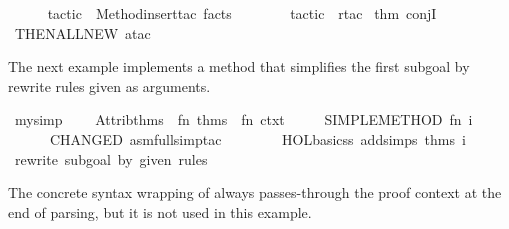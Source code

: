 \begin{isabellebody}
\endisatagML
{\isafoldML}%
%
\isadelimML
\isanewline
%
\endisadelimML
%
\isadelimproof
\ \ \ \ %
\endisadelimproof
%
\isatagproof
{}\isamarkupfalse%
\ {}tactic\ {}\ Method{}insert{}tac\ facts\ {}\ {}{}\isanewline
\ \ \ \ \isamarkupfalse%
\ {}tactic\ {}\ {}rtac\ %
\isaantiq
thm\ conjI{}%
\endisaantiq
\ THEN{}ALL{}NEW\ atac{}\ {}\ {}{}\isanewline
\ \ \ \ \isamarkupfalse%
%
\endisatagproof
{\isafoldproof}%
%
\isadelimproof
\isanewline
%
\endisadelimproof
{}\isamarkupfalse%
%
\begin{isamarkuptext}%
\medskip The next example implements a method that simplifies
  the first subgoal by rewrite rules given as arguments.%
\end{isamarkuptext}%
\isamarkuptrue%
%
\isadelimML
%
\endisadelimML
%
\isatagML
{}\isamarkupfalse%
\ my{}simp\ {}\ {}\isanewline
\ \ Attrib{}thms\ {}{}\ {}fn\ thms\ {}{}\ fn\ ctxt\ {}{}\isanewline
\ \ \ \ SIMPLE{}METHOD{}\ {}fn\ i\ {}{}\isanewline
\ \ \ \ \ \ CHANGED\ {}asm{}full{}simp{}tac\isanewline
\ \ \ \ \ \ \ \ {}HOL{}basic{}ss\ addsimps\ thms{}\ i{}{}{}\isanewline
{}\ {}rewrite\ subgoal\ by\ given\ rules{}%
\endisatagML
{\isafoldML}%
%
\isadelimML
%
\endisadelimML
%
\begin{isamarkuptext}%
The concrete syntax wrapping of \hyperlink{command.method-setup}{\mbox{}} always
  passes-through the proof context at the end of parsing, but it is
  not used in this example.


\end{isamarkuptext}
\end{isabellebody}
